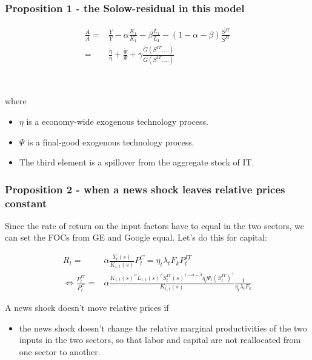 \documentclass{beamer}
\begin{document}
\begin{frame}
\frametitle{Proposition 1 - the Solow-residual in this model}

\begin{align*}
\frac{\dot{A}}{A} = & \frac{\dot{Y}}{Y} - \alpha \frac{\dot{K_1}}{K_1} - \beta \frac{\dot{L_1}}{L_1} - (1-\alpha - \beta) \frac{\dot{S^{IT}}}{S^{IT}} \\
= & \frac{\dot{\eta}}{\eta} + \frac{\dot{\Psi}}{\Psi} + \gamma \frac{\dot{G}(S^{IT},\dots)}{G(S^{IT},\dots)}
\end{align*}

\

where
\begin{itemize}
	\item $\eta$ is a economy-wide exogenous technology process.
	\item $\Psi$ is a final-good exogenous technology process.
	\item The third element is a spillover from the aggregate stock of IT.
	\end{itemize}


\end{frame}

\begin{frame}
\frametitle{Proposition 2 - when a news shock leaves relative prices constant}

Since the rate of return on the input factors have to equal in the two sectors, we can set the FOCs from GE and Google equal. Let's do this for capital:

\begin{align*}
R_t = & \alpha \frac{Y_t(s)}{K_{1,t}(s)} P^C_t = \eta_t \lambda_t F_k P^{IT}_t \\
\Leftrightarrow \frac{P^{IT}_t }{P^{C}_t } = & \alpha \frac{K_{1,t}(s)^{\alpha}L_{1,t}(s)^{\beta}S^{IT}_t(s)^{1-\alpha - \beta}\eta_t \Psi_t (S^{IT}_t)^{\gamma} }{K_{1,t}(s)} \frac{1}{\eta_t \lambda_t F_k}
\end{align*}


A news shock doesn't move relative prices if 
\begin{itemize}
\item the news shock doesn't change the relative marginal productivities of the two inputs in the two sectors, so that labor and capital are not reallocated from one sector to another.
\end{itemize}

\end{frame}
\end{document}
